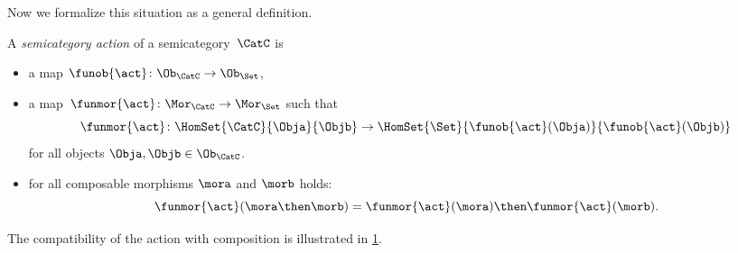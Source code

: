 Now we formalize this situation as a general definition. 

\begin{ctdefinition}
    \label{def:semicategory-action}
    A \emph{semicategory action} of a semicategory~$\CatC$ is
    
    \constit
    \begin{itemize}
        \item a map $\funob{\act} \colon \Ob_{\CatC} \to \Ob_{\Set}$,
        \item a map~$\funmor{\act} \colon \Mor_\CatC \to \Mor_\Set$ such that 
        \begin{equation}
\funmor{\act} \colon  \HomSet{\CatC}{\Obja}{\Objb} \to \HomSet{\Set}{ \funob{\act}(\Obja)}{\funob{\act}(\Objb)}
        \end{equation}
        for all objects $\Obja, \Objb \in \Ob_{\CatC}$. 
    \end{itemize}

    
    \condit
    
    \begin{itemize}
   \item for all composable morphisms $\mora$ and $\morb$ holds: 
   \begin{equation}
\funmor{\act}(\mora \then \morb) = \funmor{\act}(\mora) \then \funmor{\act}(\morb). 
    \end{equation}
    \end{itemize}
\end{ctdefinition}

The compatibility of the action with composition is illustrated in \cref{fig:semicat_ac_comm}. 

\begin{figure}[h!]
\label{fig:semicat_ac_comm}
    \begin{center}
    \end{center}
    \caption{}
\end{figure}



